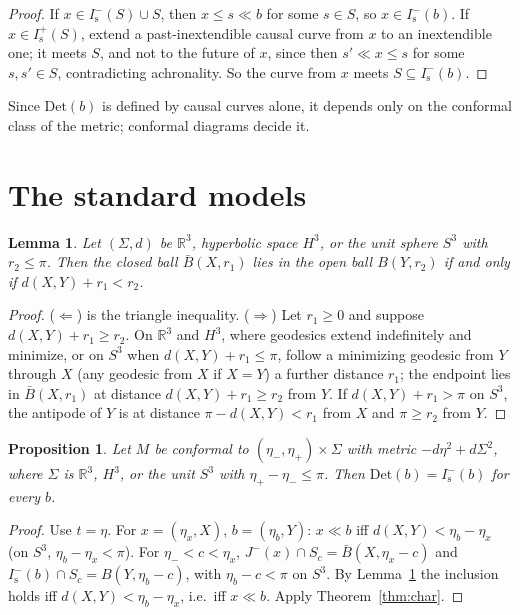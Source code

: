 \documentclass[11pt]{article}
\newtheorem{proposition}[theorem]{Proposition}
\newtheorem{lemma}[theorem]{Lemma}
\theoremstyle{definition}
\newcommand{\Is}{I^-_{\mathrm s}}
\newcommand{\Isp}{I^+_{\mathrm s}}
\newcommand{\Det}{\mathrm{Det}}
\begin{document}
\begin{proof}
If $x\in\Is(S)\cup S$, then $x\le s\ll b$ for some $s\in S$, so $x\in\Is(b)$.
If $x\in\Isp(S)$, extend a past-inextendible causal curve from $x$ to an
inextendible one; it meets $S$, and not to the future of $x$, since then
$s'\ll x\le s$ for some $s,s'\in S$, contradicting achronality. So the curve
from $x$ meets $S\subseteq\Is(b)$.
\end{proof}

Since $\Det(b)$ is defined by causal curves alone, it depends only on the
conformal class of the metric; conformal diagrams decide it.

\section{The standard models}\label{sec:examples}

\begin{lemma}\label{lem:balls}
Let $(\Sigma,d)$ be $\mathbb R^3$, hyperbolic space $H^3$, or the unit sphere
$S^3$ with $r_2\le\pi$. Then the closed ball $\bar B(X,r_1)$ lies in the open
ball $B(Y,r_2)$ if and only if $d(X,Y)+r_1<r_2$.
\end{lemma}

\begin{proof}
($\Leftarrow$) is the triangle inequality. ($\Rightarrow$) Let $r_1\ge0$ and suppose
$d(X,Y)+r_1\ge r_2$. On $\mathbb R^3$ and $H^3$, where geodesics extend
indefinitely and minimize, or on $S^3$ when $d(X,Y)+r_1\le\pi$, follow a minimizing geodesic from $Y$ through $X$ (any geodesic from
$X$ if $X=Y$) a further distance $r_1$; the endpoint lies in $\bar B(X,r_1)$ at
distance $d(X,Y)+r_1\ge r_2$ from $Y$. If $d(X,Y)+r_1>\pi$ on $S^3$, the
antipode of $Y$ is at distance $\pi-d(X,Y)<r_1$ from $X$ and $\pi\ge r_2$ from
$Y$.
\end{proof}

\begin{proposition}\label{prop:conformal}
Let $M$ be conformal to $(\eta_-,\eta_+)\times\Sigma$ with metric
$-d\eta^2+d\Sigma^2$, where $\Sigma$ is $\mathbb R^3$, $H^3$, or the unit $S^3$
with $\eta_+-\eta_-\le\pi$. Then $\Det(b)=\Is(b)$ for every $b$.
\end{proposition}

\begin{proof}
Use $t=\eta$. For $x=(\eta_x,X)$, $b=(\eta_b,Y)$: $x\ll b$ iff
$d(X,Y)<\eta_b-\eta_x$ (on $S^3$, $\eta_b-\eta_x<\pi$). For $\eta_-<c<\eta_x$,
$J^-(x)\cap S_c=\bar B(X,\eta_x-c)$ and $\Is(b)\cap S_c=B(Y,\eta_b-c)$, with
$\eta_b-c<\pi$ on $S^3$. By Lemma~\ref{lem:balls} the inclusion holds iff
$d(X,Y)<\eta_b-\eta_x$, i.e.\ iff $x\ll b$. Apply Theorem~\ref{thm:char}.
\end{proof}
\end{document}
